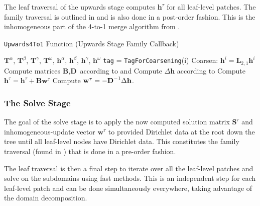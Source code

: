 The leaf traversal of the upwards stage computes $\textbf{h}^{\tau}$ for all leaf-level patches. The family traversal is outlined in  and is also done in a post-order fashion. This is the inhomogeneous part of the 4-to-1 merge algorithm from .

\begin{algorithm}[h]
    \caption{\texttt{Upwards4To1} Function (Upwards Stage Family Callback)}
    \begin{algorithmic}[0]
        \Require $\textbf{T}^{\alpha}$, $\textbf{T}^{\beta}$, $\textbf{T}^{\gamma}$, $\textbf{T}^{\omega}$, $\textbf{h}^{\alpha}$, $\textbf{h}^{\beta}$, $\textbf{h}^{\gamma}$, $\textbf{h}^{\omega}$
        \State \texttt{tag} = \texttt{TagForCoarsening}(i)
        \State Coarsen: $\textbf{h}^{i} = \textbf{L}_{2,1} \textbf{h}^{i}$
        \EndIf
        \EndFor
        \State Compute matrices $\textbf{B}, \textbf{D}$ according to  and 
        \State Compute $\Delta \textbf{h}$ according to 
        \State Compute $\textbf{h}^{\tau} = \textbf{h}^{\tau} + \textbf{B} \textbf{w}^{\tau}$
        \State Compute $\textbf{w}^{\tau} = -\textbf{D}^{-1} \Delta \mathbf h$.
    \end{algorithmic}
    \label{alg:upwards_merge}
\end{algorithm}

\subsubsection{The Solve Stage}

The goal of the solve stage is to apply the now computed solution matrix $\textbf{S}^{\tau}$ and inhomogeneous-update vector $\textbf{w}^{\tau}$ to provided Dirichlet data at the root down the tree until all leaf-level nodes have Dirichlet data. This constitutes the family traversal (found in ) that is done in a pre-order fashion.

The leaf traversal is then a final step to iterate over all the leaf-level patches and solve  on the subdomains using fast methods. This is an independent step for each leaf-level patch and can be done simultaneously everywhere, taking advantage of the domain decomposition.

